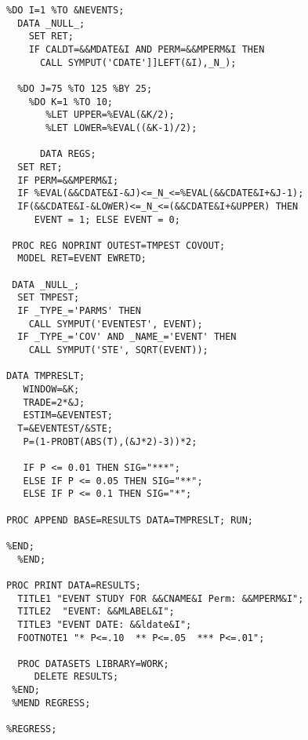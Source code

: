 \begin{singlespace}
\begin{lstlisting}[language=sas,caption=Event studies with SAS]
%MACRO REGRESS;
%DO I=1 %TO &NEVENTS;
  DATA _NULL_;
    SET RET;
    IF CALDT=&&MDATE&I AND PERM=&&MPERM&I THEN
      CALL SYMPUT('CDATE']]LEFT(&I),_N_);

  %DO J=75 %TO 125 %BY 25;
    %DO K=1 %TO 10;
       %LET UPPER=%EVAL(&K/2);
       %LET LOWER=%EVAL((&K-1)/2);

      DATA REGS;
  SET RET;
  IF PERM=&&MPERM&I;
  IF %EVAL(&&CDATE&I-&J)<=_N_<=%EVAL(&&CDATE&I+&J-1);
  IF(&&CDATE&I-&LOWER)<=_N_<=(&&CDATE&I+&UPPER) THEN
     EVENT = 1; ELSE EVENT = 0;

 PROC REG NOPRINT OUTEST=TMPEST COVOUT;
  MODEL RET=EVENT EWRETD;

 DATA _NULL_;
  SET TMPEST;
  IF _TYPE_='PARMS' THEN
    CALL SYMPUT('EVENTEST', EVENT);
  IF _TYPE_='COV' AND _NAME_='EVENT' THEN
    CALL SYMPUT('STE', SQRT(EVENT));

DATA TMPRESLT;
   WINDOW=&K;
   TRADE=2*&J;
   ESTIM=&EVENTEST;
  T=&EVENTEST/&STE;
   P=(1-PROBT(ABS(T),(&J*2)-3))*2;

   IF P <= 0.01 THEN SIG="***";
   ELSE IF P <= 0.05 THEN SIG="**";
   ELSE IF P <= 0.1 THEN SIG="*";

PROC APPEND BASE=RESULTS DATA=TMPRESLT; RUN;

%END;
  %END;

PROC PRINT DATA=RESULTS;
  TITLE1 "EVENT STUDY FOR &&CNAME&I Perm: &&MPERM&I";
  TITLE2  "EVENT: &&MLABEL&I";
  TITLE3 "EVENT DATE: &&ldate&I";
  FOOTNOTE1 "* P<=.10  ** P<=.05  *** P<=.01";

  PROC DATASETS LIBRARY=WORK;
     DELETE RESULTS;
 %END;
 %MEND REGRESS;

%REGRESS;
\end{lstlisting}
\end{singlespace}
